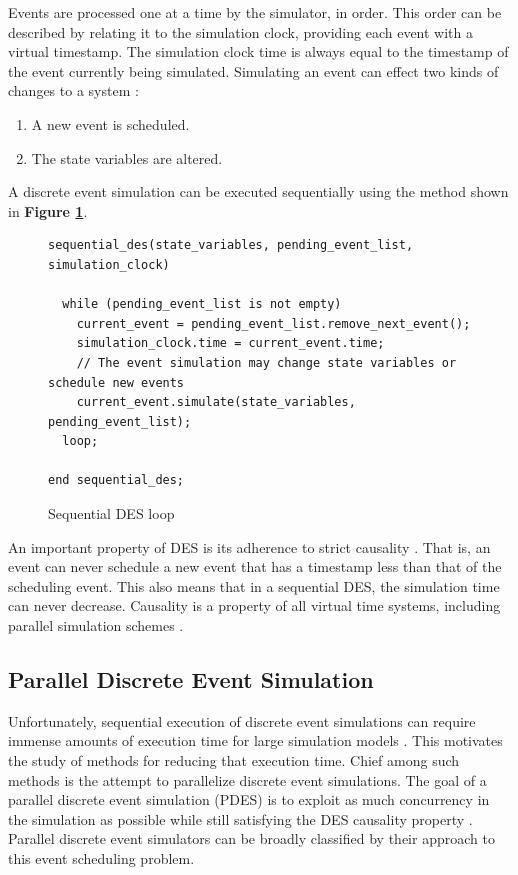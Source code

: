 \documentclass[11pt]{book}
\begin{document}
Events are processed one at a time by the simulator, in order. This order can be
described by relating it to the simulation clock, providing each event with a
virtual timestamp. The simulation clock time is always equal to the timestamp of
the event currently being simulated. Simulating an event can effect two kinds of
changes to a system \cite{fujimoto-pdes}:

\begin{enumerate}
  \item A new event is scheduled.
  \item The state variables are altered.
\end{enumerate}

A discrete event simulation can be executed sequentially using the method shown
in \textbf{Figure \ref{sequential-des}}.

\begin{figure}[h]
\centering
\begin{verbatim}
sequential_des(state_variables, pending_event_list, simulation_clock)

  while (pending_event_list is not empty)
    current_event = pending_event_list.remove_next_event();
    simulation_clock.time = current_event.time;
    // The event simulation may change state variables or schedule new events
    current_event.simulate(state_variables, pending_event_list);
  loop;

end sequential_des;
\end{verbatim}
\caption{Sequential DES loop \cite{jacob-13}}
\label{sequential-des}
\end{figure}

An important property of DES is its adherence to strict causality
\cite{fujimoto-pdes}. That is, an event can never schedule a new event that has
a timestamp less than that of the scheduling event. This also means that in a
sequential DES, the simulation time can never decrease. Causality is a property
of all virtual time systems, including parallel simulation schemes
\cite{lamport-78}.

\subsection{\textbf{Parallel Discrete Event Simulation}}

Unfortunately, sequential execution of discrete event simulations can require
immense amounts of execution time for large simulation models
\cite{fujimoto-pdes}. This motivates the study of methods for reducing that
execution time. Chief among such methods is the attempt to parallelize discrete
event simulations. The goal of a parallel discrete event simulation (PDES) is to
exploit as much concurrency in the simulation as possible while still satisfying
the DES causality property \cite{fujimoto-89b}. Parallel discrete event
simulators can be broadly classified by their approach to this event scheduling
problem.
\end{document}
